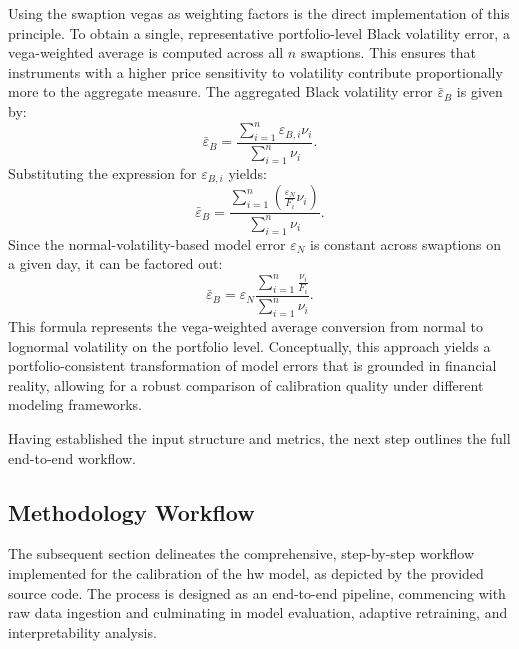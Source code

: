 Using the swaption vegas as weighting factors is the direct implementation of this principle. To obtain a single, representative portfolio-level Black volatility error, a vega-weighted average is computed across all \( n \) swaptions. This ensures that instruments with a higher price sensitivity to volatility contribute proportionally more to the aggregate measure. The aggregated Black volatility error \( \bar{\varepsilon}_B \) is given by:
\begin{equation}
	\bar{\varepsilon}_B = \frac{\sum_{i=1}^{n} \varepsilon_{B,i} \nu_i}{\sum_{i=1}^{n} \nu_i}.
\end{equation}
Substituting the expression for \( \varepsilon_{B,i} \) yields:
\begin{equation}
	\bar{\varepsilon}_B = \frac{\sum_{i=1}^{n} \left( \frac{\varepsilon_N}{F_i} \nu_i \right)}{\sum_{i=1}^{n} \nu_i}.
\end{equation}
Since the normal-volatility-based model error \( \varepsilon_N \) is constant across swaptions on a given day, it can be factored out:
\begin{equation}
	\bar{\varepsilon}_B = \varepsilon_N \frac{\sum_{i=1}^{n} \frac{\nu_i}{F_i}}{\sum_{i=1}^{n} \nu_i}.
\end{equation}
This formula represents the vega-weighted average conversion from normal to lognormal volatility on the portfolio level. Conceptually, this approach yields a portfolio-consistent transformation of model errors that is grounded in financial reality, allowing for a robust comparison of calibration quality under different modeling frameworks.

Having established the input structure and metrics, the next step outlines the full end-to-end workflow.

\subsection{Methodology Workflow}
The subsequent section delineates the comprehensive, step-by-step workflow implemented for the calibration of the \ac{hw} model, as depicted by the provided source code. The process is designed as an end-to-end pipeline, commencing with raw data ingestion and culminating in model evaluation, adaptive retraining, and interpretability analysis.

